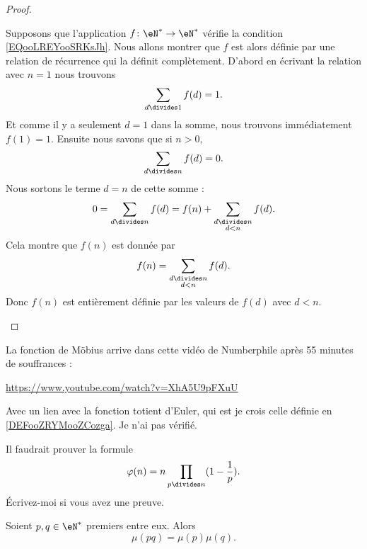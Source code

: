 \begin{proof}
\begin{subproof}
		\spitem[Unicité]
		Supposons que l'application \(f \colon \eN^*\to \eN^*  \) vérifie la condition \ref{EQooLREYooSRKsJh}. Nous allons montrer que \( f\) est alors définie par une relation de récurrence qui la définit complètement. D'abord en écrivant la relation avec \( n=1\) nous trouvons
		\begin{equation}
			\sum_{d\divides 1}f(d)=1.
		\end{equation}
		Et comme il y a seulement \( d=1\) dans la somme, nous trouvons immédiatement \( f(1)=1\). Ensuite nous savons que si \( n>0\),
		\begin{equation}
			\sum_{d\divides n}f(d)=0.
		\end{equation}
		Nous sortons le terme \( d=n\) de cette somme :
		\begin{equation}
			0=\sum_{d\divides n}f(d)=f(n)+\sum_{\substack{ d\divides n \\ d<n }  }f(d).
		\end{equation}
		Cela montre que \( f(n)\) est donnée par
		\begin{equation}
			f(n)=\sum_{\substack{d\divides n \\ d<n }  }f(d).
		\end{equation}
		Donc \( f(n)\) est entièrement définie par les valeurs de \( f(d)\) avec \( d<n\).
	\end{subproof}
\end{proof}


\begin{normaltext}			\label{NORMooAULBooKxNwLJ}
	La fonction de Möbius arrive dans cette vidéo de Numberphile après 55 minutes de souffrances :
	\begin{center}
		\url{https://www.youtube.com/watch?v=XhA5U9pFXuU}
	\end{center}
	Avec un lien avec la fonction totient d'Euler, qui est je crois celle définie en \ref{DEFooZRYMooZCozga}. Je n'ai pas vérifié.

	Il faudrait prouver la formule
	\begin{equation}
		\varphi(n)=n\prod_{p\divides n}(1-\frac{1}{ p}).
	\end{equation}
	Écrivez-moi si vous avez une preuve.
\end{normaltext}

\begin{proposition}     \label{PROPooOVYJooFvmxyj}
	Soient \( p,q\in \eN^*\) premiers entre eux. Alors
	\begin{equation}		\label{EQooXEIAooMGIhtZ}
		\mu(pq)=\mu(p)\mu(q).
	\end{equation}
\end{proposition}

